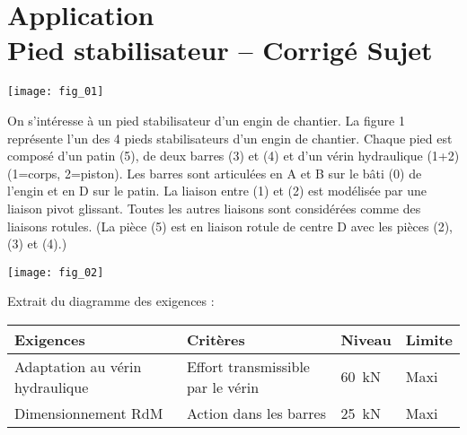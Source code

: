 \chapter*{Application  \\ 
Pied stabilisateur -- \ifprof Corrigé \else Sujet \fi}

\iflivret {} \else
\ifprof  {} \else \fi
\fi

\setcounter{question}{0}
\begin{marginfigure}
\texttt{[image: fig\_01]}
\end{marginfigure}

\ifprof
\else
On s’intéresse à un pied stabilisateur d’un engin de chantier.
La figure 1 représente l’un des 4 pieds stabilisateurs d’un engin de chantier. Chaque pied est composé d’un patin (5), de deux barres (3) et (4) et d’un vérin hydraulique (1+2) (1=corps, 2=piston). Les barres sont articulées en A et B sur le bâti (0) de l’engin et en D sur le patin. La liaison entre (1) et (2) est modélisée par une liaison pivot glissant. Toutes les autres liaisons sont considérées comme des liaisons rotules. (La pièce (5) est en liaison rotule de centre D avec les pièces (2), (3) et (4).)

\begin{center}
\texttt{[image: fig\_02]}\hfill
\end{center}

Extrait du diagramme des exigences :
\begin{center}
\begin{tabular}{llll}
\hline
Exigences & Critères & Niveau & Limite \\
\hline
Adaptation au vérin hydraulique	& Effort transmissible par le vérin  & \SI{60}{kN} & Maxi \\
Dimensionnement RdM & Action dans les barres & \SI{25}{kN} & Maxi \\
\hline
\end{tabular}
\end{center}

